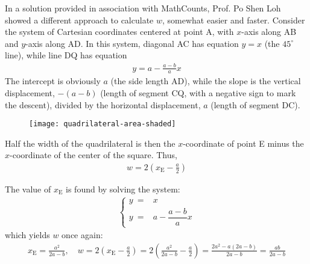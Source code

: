 \newpage 
In a solution provided in association with MathCounts, Prof. Po Shen Loh showed a different approach to calculate $w$, somewhat easier and faster. Consider the system of Cartesian coordinates centered at point A, with $x$-axis along AB and $y$-axis along AD. In this system, diagonal AC has equation $y=x$ (the $45^{\circ}$ line), while line DQ has equation
\begin{align*}
y = a - \frac{a-b}{a} x
\end{align*}
The intercept is obviously $a$ (the side length AD), while the slope is the vertical displacement, $-(a-b)$ (length of segment CQ, with a negative sign to mark the descent), divided by the horizontal displacement, $a$ (length of segment DC).
\begin{figure}[H]
\centering
\texttt{[image: quadrilateral-area-shaded]}
\end{figure}
Half the width of the quadrilateral is then the $x$-coordinate of point E minus the $x$-coordinate of the center of the square. Thus,
\begin{align*}
w = 2\left(x_{\text{E}} - \frac{a}{2}\right)
\end{align*}

The value of $x_{\text{E}}$ is found by solving the system:
\begin{align*}
\begin{cases}
y ~= & x \\
y ~= & a - \dfrac{a-b}{a} x
\end{cases}
\end{align*}
which yields $w$ once again:
\begin{align*}
x_{\text{E}} = \frac{a^2}{2a-b}, 
  \quad
w = 2\left(x_{\text{E}} - \frac{a}{2}\right)
  = 2 \left(\frac{a^2}{2a-b}-\frac{a}{2}\right)
  = \frac{2a^2-a(2a-b)}{2a-b}
  = \frac{ab}{2a-b}
\end{align*}
